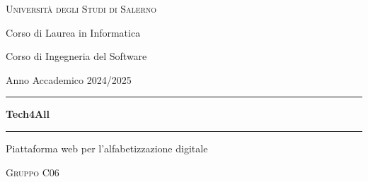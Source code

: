 %

\begin{titlepage}
\centering
\singlespacing
\setlength{\parskip}{0pt}
\thispagestyle{empty}

\vspace*{0.8cm}

{\Large\scshape Università degli Studi di Salerno\par}
\vspace{0.45cm}
{\large Corso di Laurea in Informatica\par}
\vspace{0.25cm}
{\large Corso di Ingegneria del Software\par}
\vspace{0.3cm}
{\normalsize Anno Accademico 2024/2025\par}

\vspace{1.7cm}

{\color{techVerde}\rule{0.8\textwidth}{1pt}}

\vspace{0.9cm}
{\Huge\bfseries Tech4All\par}
\vspace{0.6cm}
{\LARGE \titoloDocumento\par}
\vspace{0.9cm}

{\color{techVerde}\rule{0.8\textwidth}{1pt}}

\vspace{1cm}

{\large Piattaforma web per l'alfabetizzazione digitale\par}

\vspace{1.3cm}

{\large\scshape Gruppo C06\par}

\vspace{0.8cm}


\end{titlepage}
